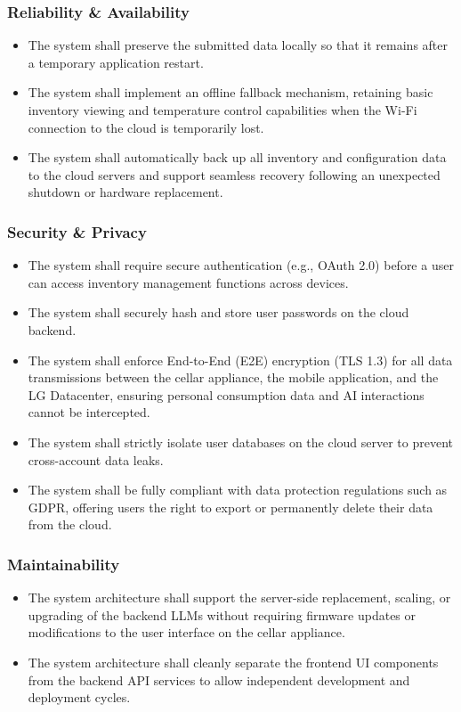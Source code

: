 \documentclass[conference]{IEEEtran}
\begin{document}
\subsubsection{Reliability \& Availability}
\begin{itemize}
    \item The system shall preserve the submitted data locally so that it remains after a temporary application restart.
    \item The system shall implement an offline fallback mechanism, retaining basic inventory viewing and temperature control capabilities when the Wi-Fi connection to the cloud is temporarily lost.
    \item The system shall automatically back up all inventory and configuration data to the cloud servers and support seamless recovery following an unexpected shutdown or hardware replacement.
\end{itemize}

\subsubsection{Security \& Privacy}
\begin{itemize}
    \item The system shall require secure authentication (e.g., OAuth 2.0) before a user can access inventory management functions across devices.
    \item The system shall securely hash and store user passwords on the cloud backend.
    \item The system shall enforce End-to-End (E2E) encryption (TLS 1.3) for all data transmissions between the cellar appliance, the mobile application, and the LG Datacenter, ensuring personal consumption data and AI interactions cannot be intercepted.
    \item The system shall strictly isolate user databases on the cloud server to prevent cross-account data leaks.
    \item The system shall be fully compliant with data protection regulations such as GDPR, offering users the right to export or permanently delete their data from the cloud.
\end{itemize}

\subsubsection{Maintainability}
\begin{itemize}
    \item The system architecture shall support the server-side replacement, scaling, or upgrading of the backend LLMs without requiring firmware updates or modifications to the user interface on the cellar appliance.
    \item The system architecture shall cleanly separate the frontend UI components from the backend API services to allow independent development and deployment cycles.
\end{itemize}
\end{document}
